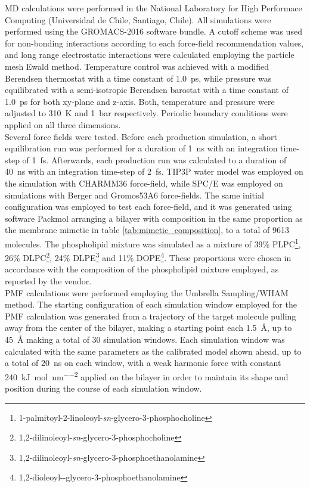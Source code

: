 \documentclass[3p,preprint,review]{elsarticle}
\begin{document}
	MD calculations were performed in the National Laboratory for High Performace
	Computing (Universidad de Chile, Santiago, Chile).
	All simulations were performed using the GROMACS-2016\cite{Abraham2015}
	software
	bundle. A cutoff scheme was used for non-bonding interactions according to each
	force-field recommendation values, and long range electrostatic interactions
	were calculated employing the particle mesh Ewald method\cite{DiPierro2015}.
	Temperature control was achieved with a modified Berendsen
	thermostat\cite{Bussi2007} with a time constant of \SI{1.0}{ps}, while pressure
	was equilibrated with a semi-isotropic Berendsen barostat\cite{Berendsen1984}
	with a time constant of \SI{1.0}{ps} for both xy-plane and z-axis. Both,
	temperature and pressure were adjusted to \SI{310}{K} and \SI{1}{bar}
	respectively. Periodic
	boundary conditions were applied on all three dimensions.\\ Several force
	fields were tested.
	Before each production simulation, a short equilibration run was performed for
	a
	duration of \SI{1}{ns} with an integration time-step of \SI{1}{fs}. Afterwards,
	each production run was calculated to a duration of \SI{40}{ns} with an
	integration time-step of \SI{2}{fs}. TIP3P water
	model\cite{Neria1996,Jorgensen1983} was employed on the
	simulation with CHARMM36 force-field, while SPC/E\cite{Berendsen1987} was
	employed on simulations
	with Berger and Gromos53A6 force-fields. The same initial configuration was
	employed to test each force-field, and it was generated using software
	Packmol\cite{Martinez2009} arranging a bilayer with composition in the same
	proportion as the membrane mimetic in table \ref{tab:mimetic_composition}, to a
	total of 9613 molecules. The phospholipid mixture was simulated as a mixture of
	39\%
	PLPC\footnote{1-palmitoyl-2-linoleoyl-\textit{sn}-glycero-3-phosphocholine},
	26\% DLPC\footnote{1,2-dilinoleoyl-\textit{sn}-glycero-3-phosphocholine}, 24\%
	DLPE\footnote{1,2-dilinoleoyl-\textit{sn}-glycero-3-phosphoethanolamine} and
	11\% DOPE\footnote{1,2-dioleoyl--glycero-3-phosphoethanolamine}. These
	proportions were chosen in accordance with the composition of the phospholipid
	mixture employed, as
	reported by the vendor.\\
	PMF calculations were performed employing the Umbrella Sampling/WHAM
	method\cite{Kumar1992}. The starting configuration of each simulation window
	employed for the PMF calculation was generated from a trajectory of the target
	molecule pulling away from the center of the bilayer, making a starting point
	each \SI{1.5}{\angstrom}, up to \SI{45}{\angstrom} making a total of 30 simulation
	windows. Each simulation window was calculated with the same parameters as the
	calibrated model shown ahead, up to a total of \SI{20}{ns} on each window, with
	a weak harmonic force with constant
	\SI{240}{\kilo\joule\per\mole\per\nano\meter\squared} applied on the bilayer
	in order to maintain its shape and position during the course of each
	simulation window.\\
	
\end{document}
